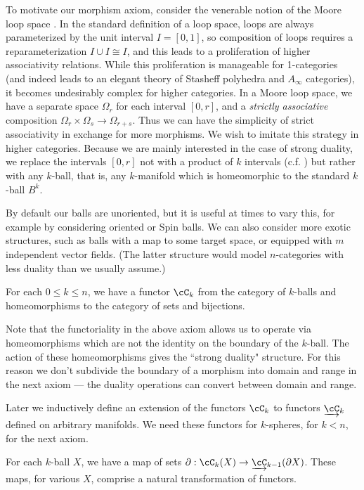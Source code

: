\documentclass{pnastwo}
\begin{document}
\begin{article}
To motivate our morphism axiom, consider the venerable notion of the Moore loop space
\cite[\S 2.2]{MR505692}.
In the standard definition of a loop space, loops are always parameterized by the unit interval $I = [0,1]$,
so composition of loops requires a reparameterization $I\cup I \cong I$, and this leads to a proliferation
of higher associativity relations.
While this proliferation is manageable for 1-categories (and indeed leads to an elegant theory
of Stasheff polyhedra and $A_\infty$ categories), it becomes undesirably complex for higher categories.
In a Moore loop space, we have a separate space $\Omega_r$ for each interval $[0,r]$, and a 
{\it strictly associative} composition $\Omega_r\times \Omega_s\to \Omega_{r+s}$.
Thus we can have the simplicity of strict associativity in exchange for more morphisms.
We wish to imitate this strategy in higher categories.
Because we are mainly interested in the case of strong duality, we replace the intervals $[0,r]$ not with
a product of $k$ intervals (c.f. \cite{0909.2212}) but rather with any $k$-ball, that is, 
any $k$-manifold which is homeomorphic
to the standard $k$-ball $B^k$.

By default our balls are unoriented,
but it is useful at times to vary this,
for example by considering oriented or Spin balls.
We can also consider more exotic structures, such as balls with a map to some target space,
or equipped with $m$ independent vector fields.
(The latter structure would model $n$-categories with less duality than we usually assume.)

\begin{axiom}[Morphisms]
\label{axiom:morphisms}
For each $0 \le k \le n$, we have a functor $\cC_k$ from 
the category of $k$-balls and 
homeomorphisms to the category of sets and bijections.
\end{axiom}

Note that the functoriality in the above axiom allows us to operate via
homeomorphisms which are not the identity on the boundary of the $k$-ball.
The action of these homeomorphisms gives the ``strong duality" structure.
For this reason we don't subdivide the boundary of a morphism
into domain and range in the next axiom --- the duality operations can convert between domain and range.

Later we inductively define an extension of the functors $\cC_k$ to functors $\cl{\cC}_k$ 
defined on arbitrary manifolds. 
We need  these functors for $k$-spheres, for $k<n$, for the next axiom.

\begin{axiom}[Boundaries]\label{nca-boundary}
For each $k$-ball $X$, we have a map of sets $\bd: \cC_k(X)\to \cl{\cC}_{k-1}(\bd X)$.
These maps, for various $X$, comprise a natural transformation of functors.
\end{axiom}


\end{article}
\end{document}
